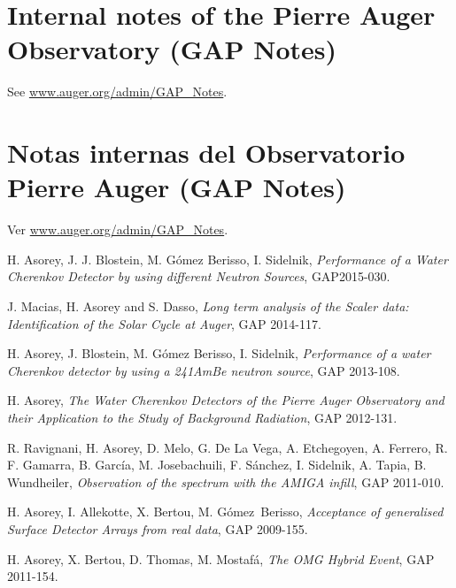 \ifeng
\section*{Internal notes of the Pierre Auger Observatory (GAP Notes)}

See \href{http://www.auger.org/admin-cgi-bin/woda/gap\_notes.pl/Search?search=asorey}{www.auger.org/admin/GAP\_Notes}.
\else
\section*{Notas internas del Observatorio Pierre Auger (GAP Notes)}

Ver \href{http://www.auger.org/admin-cgi-bin/woda/gap\_notes.pl/Search?search=asorey}{www.auger.org/admin/GAP\_Notes}.
\fi

\noindent
\begin{etaremune}

\item {} H. Asorey, J. J. Blostein, M. Gómez Berisso, I. Sidelnik, {\emph{Performance of a Water Cherenkov Detector by using different Neutron Sources}}, GAP2015-030.

\item {} J. Macias, H. Asorey and S. Dasso, {\emph{Long term analysis of the Scaler data: Identification of the Solar Cycle at Auger}}, GAP 2014-117.

\item {} H. Asorey, J. Blostein, M. Gómez Berisso, I. Sidelnik, {\emph{Performance of a water Cherenkov detector by using a 241AmBe neutron source}}, GAP 2013-108.

\item {} H. Asorey, {\emph{The Water Cherenkov Detectors of the Pierre Auger Observatory and their Application to the Study of Background Radiation}}, GAP 2012-131.

\item {} R. Ravignani, H. Asorey, D. Melo, G. De La Vega, A. Etchegoyen, A. Ferrero, R. F. Gamarra, B. García, M. Josebachuili, F. Sánchez, I. Sidelnik, A. Tapia, B. Wundheiler, {\emph{Observation of the spectrum with the AMIGA infill}}, GAP 2011-010.

\item {}H. Asorey, I. Allekotte, X. Bertou, M. Gómez~Berisso, {\emph{Acceptance of generalised Surface Detector Arrays from real data}}, GAP 2009-155.

\item {}H. Asorey, X. Bertou, D. Thomas, M. Mostafá, {\emph{The OMG Hybrid Event}}, GAP 2011-154.


\end{etaremune}
